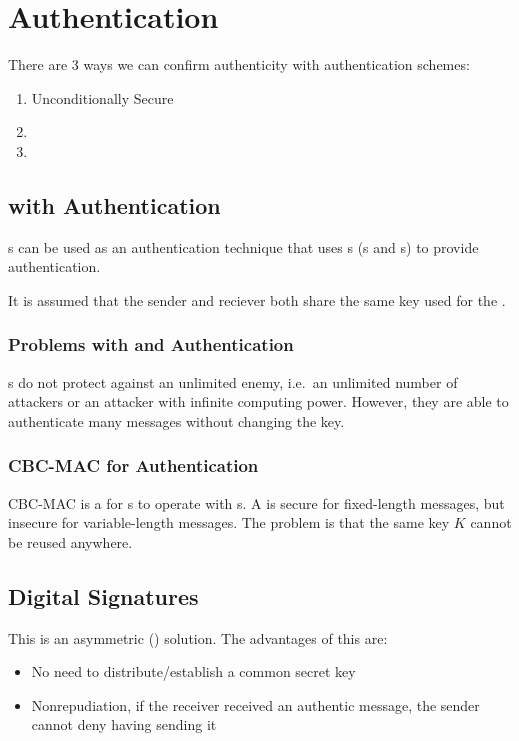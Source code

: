 \section{Authentication}\label{sec:Authentication}
There are 3 ways we can confirm authenticity with authentication schemes:
\begin{enumerate}[noitemsep]
\item Unconditionally Secure 
\item {}
\item {}
\end{enumerate}

\subsection{ with Authentication}\label{subsec:MAC_Authentication}
s can be used as an authentication technique that uses s (s and s) to provide authentication.

\begin{remark*}
  It is assumed that the sender and reciever both share the same key used for the .
\end{remark*}

\subsubsection{Problems with  and Authentication}\label{subsubsec:MAC_Problems_Authentication}
s do not protect against an unlimited enemy, i.e.\ an unlimited number of attackers or an attacker with infinite computing power.
However, they are able to authenticate many messages without changing the key.

\subsubsection{CBC-MAC for Authentication}\label{subsubsec:CBC_MAC_Authentication}
CBC-MAC is a  for s to operate with s.
A  is secure for fixed-length messages, but insecure for variable-length messages.
The problem is that the same key $K$ cannot be reused anywhere.

\subsection{Digital Signatures}\label{subsec:Digital_Signatures}
This is an asymmetric () solution.
The advantages of this are:
\begin{itemize}[noitemsep]
\item No need to distribute/establish a common secret key
\item Nonrepudiation, if the receiver received an authentic message, the sender cannot deny having sending it
\end{itemize}

